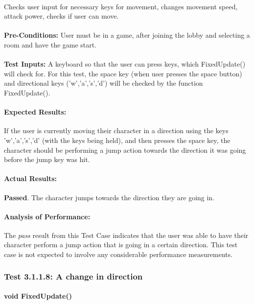 \documentclass{article}
\begin{document}
    \paragraph{} Checks user input for necessary keys for movement, changes movement speed, attack power, checks if user can move.
    \paragraph{}\textbf{Pre-Conditions:} User must be in a game, after joining the lobby and selecting a room and have the game start.
    \paragraph{}\textbf{Test Inputs:} A keyboard so that the user can press keys, which FixedUpdate() will check for. For this test, the space key (when user presses the space button) and directional keys ('w','a','s','d') will be checked by the function FixedUpdate(). 
    \paragraph{Expected Results:} If the user is currently moving their character in a direction using the keys 'w','a','s','d' (with the keys being held), and then presses the space key, the character should be performing a jump action towards the direction it was going before the jump key was hit. 
    \paragraph{Actual Results:} \textbf{Passed}. The character jumps towards the direction they are going in.
    \paragraph{Analysis of Performance:} The \emph{pass} result from this Test Case indicates that the user was able to have their character perform a jump action that is going in a certain direction. This test case is not expected to involve any considerable performance measurements.
    
    \subsubsection{Test 3.1.1.8: A change in direction}
    \paragraph{}\textbf{void FixedUpdate()}
\end{document}
